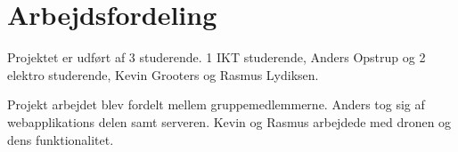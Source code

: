 \section{Arbejdsfordeling}

Projektet er udført af 3 studerende. 1 IKT studerende, Anders Opstrup og 2 elektro studerende, Kevin Grooters og Rasmus Lydiksen.

Projekt arbejdet blev fordelt mellem gruppemedlemmerne. Anders tog sig af webapplikations delen samt serveren.
Kevin og Rasmus arbejdede med dronen og dens funktionalitet. 
